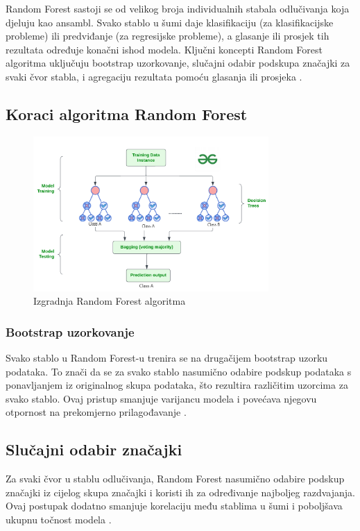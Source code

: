 \documentclass[zavrsnirad]{fer}
\begin{document}
Random Forest sastoji se od velikog broja individualnih stabala odlučivanja koja djeluju kao ansambl. Svako stablo u šumi daje klasifikaciju (za klasifikacijske probleme) ili predviđanje (za regresijske probleme), a glasanje ili prosjek tih rezultata određuje konačni ishod modela. Ključni koncepti Random Forest algoritma uključuju bootstrap uzorkovanje, slučajni odabir podskupa značajki za svaki čvor stabla, i agregaciju rezultata pomoću glasanja ili prosjeka \cite{geeksforgeeks2021}.

\subsection{Koraci algoritma Random Forest}

\begin{figure}[h]
	\centering
	\includegraphics[width=0.8\textwidth]{Figures/random_forests.png}
	\caption{Izgradnja Random Forest algoritma}
	\label{fig:random_forest}
\end{figure}

\subsubsection{Bootstrap uzorkovanje}
Svako stablo u Random Forest-u trenira se na drugačijem bootstrap uzorku podataka. To znači da se za svako stablo nasumično odabire podskup podataka s ponavljanjem iz originalnog skupa podataka, što rezultira različitim uzorcima za svako stablo. Ovaj pristup smanjuje varijancu modela i povećava njegovu otpornost na prekomjerno prilagođavanje \cite{segal2004machine}.

\subsection{Slučajni odabir značajki}
Za svaki čvor u stablu odlučivanja, Random Forest nasumično odabire podskup značajki iz cijelog skupa značajki i koristi ih za određivanje najboljeg razdvajanja. Ovaj postupak dodatno smanjuje korelaciju među stablima u šumi i poboljšava ukupnu točnost modela \cite{segal2004machine}.
\end{document}
